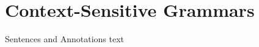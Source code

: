 

\section{Context-Sensitive Grammars}\fbeg{}\begin{frame}{}

{\fontsize{20}{23}\selectfont

Sentences and Annotations text

}

\end{frame}


